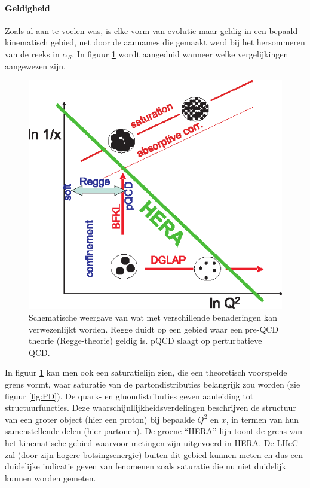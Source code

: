 \documentclass[a4paper,11pt]{article}
\numberwithin{equation}{section} %
\begin{document}
      \paragraph{Geldigheid}
Zoals al aan te voelen was, is elke vorm van evolutie maar geldig in een bepaald kinematisch gebied, net door de aannames die gemaakt werd bij het hersommeren van de reeks in $\alpha_S$.
In figuur \ref{fig:DGLAP-BFKL} wordt aangeduid wanneer welke vergelijkingen aangewezen zijn.
\begin{figure} [H]
  \begin{center}
    \includegraphics[scale=1]{Afbeeldingen/DGLAP-BFKL.eps}
    \caption{Schematische weergave van wat met verschillende benaderingen kan verwezenlijkt worden. Regge duidt op een gebied waar een pre-QCD theorie (Regge-theorie) geldig is. pQCD slaagt op perturbatieve QCD. \cite{Martin}}
   \label{fig:DGLAP-BFKL}
  \end{center}
\end{figure}
In figuur \ref{fig:DGLAP-BFKL} kan men ook een saturatielijn zien, die een theoretisch voorspelde grens vormt, waar saturatie van de partondistributies belangrijk zou worden (zie figuur \ref{fig:PD}).
De quark- en gluondistributies geven aanleiding tot structuurfuncties.
Deze waarschijnllijkheidsverdelingen beschrijven de structuur van een groter object (hier een proton) bij bepaalde $Q^2$ en $x$, in termen van hun samenstellende delen (hier partonen).
De groene “HERA”-lijn toont de grens van het kinematische gebied waarvoor metingen zijn uitgevoerd in HERA.
De LHeC zal (door zijn hogere botsingsenergie) buiten dit gebied kunnen meten en dus een duidelijke indicatie geven van fenomenen zoals saturatie die nu niet duidelijk kunnen worden gemeten.
\end{document}
